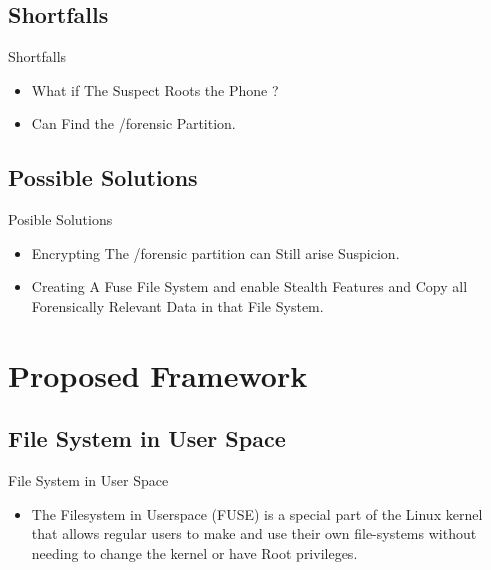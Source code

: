 \documentclass[12pt]{beamer}
\begin{document}
\subsection{Shortfalls}
\begin{frame}{Shortfalls}

	\begin{itemize}
	
	\item{
	
	What if The Suspect Roots the Phone ?
	}
	\bigskip
	\item{
	
		Can Find the /forensic Partition.	
	}	
	\end{itemize}





\end{frame}

\subsection{Possible Solutions}
\begin{frame}{Posible Solutions}
	\begin{itemize}
	\item{
	Encrypting The /forensic partition can Still arise Suspicion.
	}
	\bigskip
	\item{
	Creating A Fuse File System and enable Stealth Features and Copy all Forensically Relevant Data in that File System.
	
	}
	\end{itemize}
\end{frame}


\section{Proposed Framework}

\subsection{File System in User Space}
\begin{frame}{File System in User Space}
\begin{itemize}
\item{
The Filesystem in Userspace (FUSE) is a special part of the Linux \indent kernel that \indent allows regular users to make and use their own file-systems \indent without needing to change the kernel or have Root privileges.
}


\end{itemize}
\end{frame}
\end{document}
